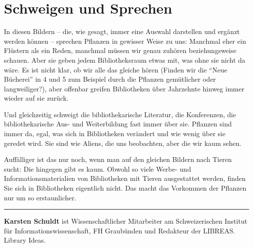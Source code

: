 \documentclass[a4paper,
fontsize=11pt,
oneside,
numbers=noperiodatend,
parskip=half-,
bibliography=totoc,
final
]{scrartcl}
\begin{document}
\hypertarget{schweigen-und-sprechen}{%
\section{Schweigen und Sprechen}\label{schweigen-und-sprechen}}

In diesen Bildern -- die, wie gesagt, immer eine Auswahl darstellen und
ergänzt werden können -- sprechen Pflanzen in gewisser Weise zu uns:
Manchmal eher ein Flüstern als ein Reden, manchmal müssen wir genau
zuhören beziehungsweise schauen. Aber sie geben jedem Bibliotheksraum
etwas mit, was ohne sie nicht da wäre. Es ist nicht klar, ob wir alle
das gleiche hören (Finden wir die \enquote{Neue Bücherei} in 4 und 5 zum
Beispiel durch die Pflanzen gemütlicher oder langweiliger?), aber
offenbar greifen Bibliotheken über Jahrzehnte hinweg immer wieder auf
sie zurück.

Und gleichzeitig schweigt die bibliothekarische Literatur, die
Konferenzen, die bibliothekarische Aus- und Weiterbildung fast immer
über sie. Pflanzen sind immer da, egal, was sich in Bibliotheken
verändert und wie wenig über sie geredet wird. Sie sind wie Aliens, die
uns beobachten, aber die wir kaum sehen.

Auffälliger ist das nur noch, wenn man auf den gleichen Bildern nach
Tieren sucht: Die hingegen gibt es kaum. Obwohl so viele Werbe- und
Informationsmaterialien von Bibliotheken mit Tieren ausgestattet werden,
finden Sie sich in Bibliotheken eigentlich nicht. Das macht das
Vorkommen der Pflanzen nur um so erstaunlicher.

\begin{center}\rule{0.5\linewidth}{0.5pt}\end{center}

\textbf{Karsten Schuldt} ist Wissenschaftlicher Mitarbeiter am
Schweizerischen Institut für Informationswissenschaft, FH Graubünden und
Redakteur der LIBREAS. Library Ideas.
\end{document}
